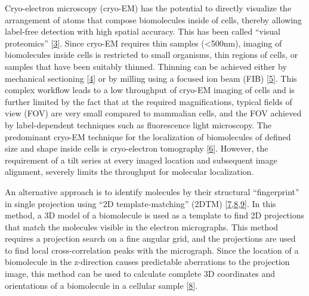 \documentclass[
]{article}
\begin{document}
Cryo-electron microscopy (cryo-EM) has the potential to directly visualize the
arrangement of atoms that compose biomolecules inside of cells, thereby
allowing label-free detection with high spatial accuracy. This has been
called ``visual proteomics'' {[}\protect\hyperlink{ref-tGQ6TSUo}{3}{]}. Since cryo-EM
requires thin samples (\textless500nm), imaging of biomolecules inside cells is
restricted to small organisms, thin regions of cells, or samples that
have been suitably thinned. Thinning can be achieved either by
mechanical sectioning {[}\protect\hyperlink{ref-g8QavfwP}{4}{]} or by
milling using a focused ion beam (FIB) {[}\protect\hyperlink{ref-16IhS1Nc4}{5}{]}. This complex workflow
leads to a low throughput of cryo-EM imaging of cells and is further
limited by the fact that at the required magnifications, typical fields
of view (FOV) are very small compared to mammalian cells, and the FOV
achieved by label-dependent techniques such as fluorescence light microscopy. The
predominant cryo-EM technique for the localization of biomolecules of
defined size and shape inside cells is cryo-electron tomography {[}\protect\hyperlink{ref-Rksh2dxu}{6}{]}. However, the requirement of a tilt series at
every imaged location and subsequent image alignment, severely limits
the throughput for molecular localization.

An alternative approach is to identify molecules by their structural
``fingerprint'' in single projection using ``2D template-matching'' (2DTM)
{[}\protect\hyperlink{ref-Ynb3IP6I}{7},\protect\hyperlink{ref-18KGpXYPE}{8},\protect\hyperlink{ref-10bXZuF3G}{9}{]}. In this
method, a 3D model of a biomolecule is used as a template to find 2D
projections that match the molecules visible in the electron
micrographs. This method requires a projection search on a fine angular
grid, and the projections are used to find local cross-correlation peaks
with the micrograph. Since the location of a biomolecule in the
z-direction causes predictable aberrations to the projection image, this
method can be used to calculate complete 3D coordinates and orientations
of a biomolecule in a cellular sample
{[}\protect\hyperlink{ref-18KGpXYPE}{8}{]}.
\end{document}
